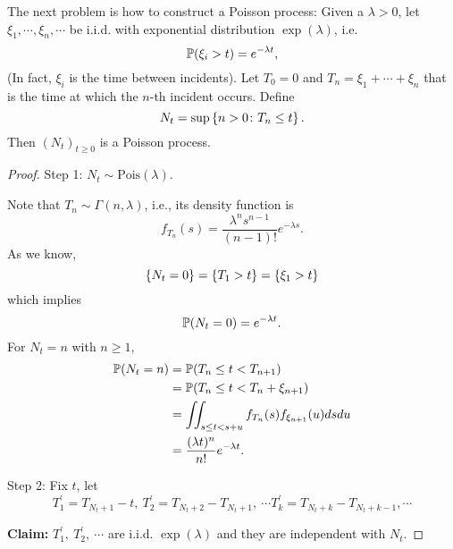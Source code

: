 \noindent The next problem is how to construct a Poisson process: Given a $\lambda > 0$, let $\xi_1,\cdots,\xi_n,\cdots$ be i.i.d. with exponential distribution $\exp(\lambda)$, i.e.
\begin{equation*}
    \mathbb{P}(\xi_i > t) = e^{-\lambda t},
\end{equation*}
(In fact, $\xi_i$ is the time between incidents). Let $T_0 = 0$ and $T_n = \xi_1 + \cdots +\xi_n$ that is the time at which the $n$-th incident occurs. Define
\begin{equation*}
    N_t = \sup\left\{n > 0 \colon T_n \leq t\right\}.
\end{equation*}
Then $(N_t)_{t \geq 0}$ is a Poisson process.
\begin{proof}
    \noindent Step 1: $N_t \sim \text{Pois}(\lambda)$.

    \noindent Note that $T_n \sim \Gamma(n,\lambda)$, i.e., its density function is
    \begin{equation*}
        f_{T_n}(s) = \frac{\lambda^n s^{n-1}}{(n-1)!}e^{-\lambda s}.
    \end{equation*}
    As we know,
    \begin{equation*}
        \left\{N_t = 0\right\} = \left\{T_1 > t\right\} = \left\{\xi_1 > t\right\}
    \end{equation*}
    which implies
    \begin{equation*}
        \mathbb{P}(N_t = 0) = e^{-\lambda t}.
    \end{equation*}
    For $N_t = n$ with $n \geq 1$,
    \begin{equation*}
        \begin{aligned}
            \mathbb{P}(N_t = n) &= \mathbb{P}(T_n \leq t < T_{n+1}) \\
            &= \mathbb{P}(T_n \leq t < T_n + \xi_{n+1}) \\
            &= \iint_{s \leq t < s+u}f_{T_n}(s)f_{\xi_{n+1}}(u)dsdu\\
            &= \frac{(\lambda t)^n}{n!}e^{-\lambda t}.
        \end{aligned}
    \end{equation*}

    \noindent Step 2: Fix $t$, let
    \begin{equation*}
        T_1^\prime = T_{N_t + 1} - t,~T_2^\prime = T_{N_t + 2} - T_{N_t+1},~\cdots T_k^\prime = T_{N_t + k} - T_{N_t+k-1},\cdots
    \end{equation*}

    \noindent \textbf{Claim:} $T_1^\prime,~T_2^\prime,~\cdots$ are i.i.d. $\exp(\lambda)$ and they are independent with $N_t$. 
    

\end{proof}
